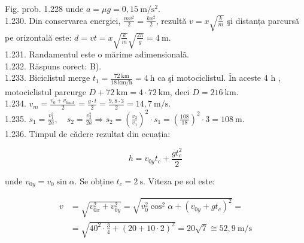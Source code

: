 \documentclass[10pt]{article}
\begin{document}
Fig. prob. 1.228 unde $a=\mu g=0,15 \mathrm{~m} / \mathrm{s}^{2}$.\\
1.230. Din conservarea energiei, $\frac{m v^{2}}{2}=\frac{k x^{2}}{2}$, rezultă $v=x \sqrt{\frac{k}{m}}$ şi distanța parcursă pe orizontală este: $d=v t=x \sqrt{\frac{k}{m}} \sqrt{\frac{2 h}{g}}=4 \mathrm{~m}$.\\
1.231. Randamentul este o mărime adimensionalã.\\
1.232. Răspuns corect: B).\\
1.233. Biciclistul merge $t_{1}=\frac{72 \mathrm{~km}}{18 \mathrm{~km} / \mathrm{h}}=4 \mathrm{~h}$ ca şi motociclistul. În aceste 4 h , motociclistul parcurge $D+72 \mathrm{~km}=4 \cdot 72 \mathrm{~km}$, deci $D=216 \mathrm{~km}$.\\
1.234. $v_{m}=\frac{v_{0}+v_{\text {final }}}{2}=\frac{g \cdot t}{2}=\frac{9,8 \cdot 3}{2}=14,7 \mathrm{~m} / \mathrm{s}$.\\
1.235. $s_{1}=\frac{v_{1}^{2}}{2 a}, \quad s_{2}=\frac{v_{2}^{2}}{2 a} \Rightarrow s_{2}=\left(\frac{v_{2}}{v_{1}}\right)^{2} \cdot s_{1}=\left(\frac{108}{18}\right)^{2} \cdot 3=108 \mathrm{~m}$.\\
1.236. Timpul de cădere rezultat din ecuația:

$$
h=v_{0 y} t_{c}+\frac{g t_{c}^{2}}{2}
$$

unde $v_{0 y}=v_{0} \sin \alpha$. Se obține $t_{c}=2 \mathrm{~s}$. Viteza pe sol este:

$$
\begin{aligned}
v & =\sqrt{v_{0 x}^{2}+v_{0 y}^{2}}=\sqrt{v_{0}^{2} \cos ^{2} \alpha+\left(v_{0 y}+g t_{c}\right)^{2}}= \\
& =\sqrt{40^{2} \cdot \frac{3}{4}+(20+10 \cdot 2)^{2}}=20 \sqrt{7} \cong 52,9 \mathrm{~m} / \mathrm{s}
\end{aligned}
$$
\end{document}

